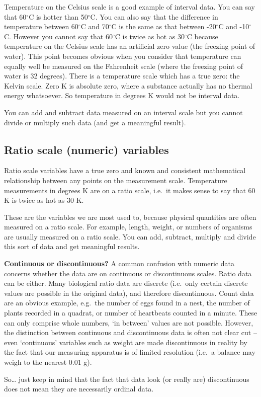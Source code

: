 \documentclass[]{book}
\begin{document}
Temperature on the Celsius scale is a good example of interval data. You
can say that 60\(^{\circ}\)C is hotter than 50\(^{\circ}\)C. You can
also say that the difference in temperature between 60\(^{\circ}\)C and
70\(^{\circ}\)C is the same as that between -20\(^{\circ}\)C and
-10\(^{\circ}\)C. However you cannot say that 60\(^{\circ}\)C is twice
as hot as 30\(^{\circ}\)C because temperature on the Celsius scale has
an artificial zero value (the freezing point of water). This point
becomes obvious when you consider that temperature can equally well be
measured on the Fahrenheit scale (where the freezing point of water is
32 degrees). There is a temperature scale which has a true zero: the
Kelvin scale. Zero K is absolute zero, where a substance actually has no
thermal energy whatsoever. So temperature in degrees K would not be
interval data.

You can add and subtract data measured on an interval scale but you
cannot divide or multiply such data (and get a meaningful result).

\subsection{Ratio scale (numeric)
variables}\label{ratio-scale-numeric-variables}

Ratio scale variables have a true zero and known and consistent
mathematical relationship between any points on the measurement scale.
Temperature measurements in degrees K are on a ratio scale, i.e.~it
makes sense to say that 60 K is twice as hot as 30 K.

These are the variables we are most used to, because physical quantities
are often measured on a ratio scale. For example, length, weight, or
numbers of organisms are usually measured on a ratio scale. You can add,
subtract, multiply and divide this sort of data and get meaningful
results.

\begin{advanced-box}
\textbf{Continuous or discontinuous?} A common confusion with numeric
data concerns whether the data are on continuous or discontinuous
scales. Ratio data can be either. Many biological ratio data are
discrete (i.e.~only certain discrete values are possible in the original
data), and therefore discontinuous. Count data are an obvious example,
e.g.~the number of eggs found in a nest, the number of plants recorded
in a quadrat, or number of heartbeats counted in a minute. These can
only comprise whole numbers, `in between' values are not possible.
However, the distinction between continuous and discontinuous data is
often not clear cut -- even `continuous' variables such as weight are
made discontinuous in reality by the fact that our measuring apparatus
is of limited resolution (i.e.~a balance may weigh to the nearest 0.01
g).

So\ldots{} just keep in mind that the fact that data look (or really
are) discontinuous does not mean they are necessarily ordinal data.
\end{advanced-box}
\end{document}
